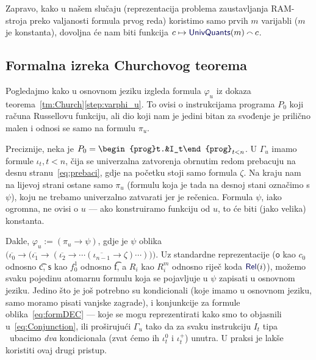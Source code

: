 Zapravo, kako u našem slučaju (reprezentacija problema zaustavljanja RAM-stroja preko valjanosti formula prvog reda) koristimo samo prvih $m$ varijabli ($m$ je konstanta), dovoljna će nam biti funkcija $c\mapsto\f{UnivQuants}(m)\conc{}c$.

\subsection{Formalna izreka Churchovog teorema}

Pogledajmo kako u osnovnom jeziku izgleda formula $\varphi_u$ iz dokaza teorema~\ref{tm:Church}\eqref{step:varphi_u}. To ovisi o instrukcijama programa $P_0$ koji računa Russellovu funkciju, ali dio koji nam je jedini bitan za svođenje je prilično malen i odnosi se samo na formulu $\pi_u$.

Preciznije, neka je $P_0=\begin{prog}t.&I_t\end{prog}_{t<n}$. U $\Gamma_u$ imamo formule $\iota_t,t<n$, čija se univerzalna zatvorenja obrnutim redom prebacuju na desnu stranu~\eqref{eq:prebaci}, gdje na početku stoji samo formula $\zeta$. Na kraju nam na lijevoj strani ostane samo $\pi_u$ (formulu koja je tada na desnoj stani označimo s $\psi$), koju ne trebamo univerzalno zatvarati jer je rečenica. Formula $\psi$, iako ogromna, ne ovisi o $u$ --- ako konstruiramo funkciju od $u$, to će biti (jako velika) konstanta.

    Dakle, $\varphi_u:=(\pi_u\to\psi)$, gdje je $\psi$ oblika $\bigl(\overline{\iota_0}\to\bigl(\overline{\iota_1}\to(\overline{\iota_2}\to\dotsb(\overline{\iota_{n-1}}\to\zeta)\dotsm)\bigr)\bigr)$\text.
Uz standardne reprezentacije ($\mathsf o$ kao $c_0$ odnosno \t c, $\mathsf s$ kao $f_0^1$ odnosno \t f, a $R_i$ kao $R_i^m$ odnosno riječ koda $\f{Rel}(i)$), možemo svaku pojedinu atomarnu formulu koja se pojavljuje u $\psi$ zapisati u osnovnom jeziku. Jedino što je još potrebno su kondicionali (koje imamo u osnovnom jeziku, samo moramo pisati vanjske zagrade), i konjunkcije za formule oblika~\eqref{eq:formDEC} --- koje se mogu reprezentirati kako smo to objasnili u~\eqref{eq:Conjunction}, ili proširujući $\Gamma_u$ tako da za svaku instrukciju $I_t$ tipa \dec\ ubacimo \emph{dva} kondicionala (zvat ćemo ih $\iota_t^0$ i $\iota_t^+$) unutra. U praksi je lakše koristiti ovaj drugi pristup.

